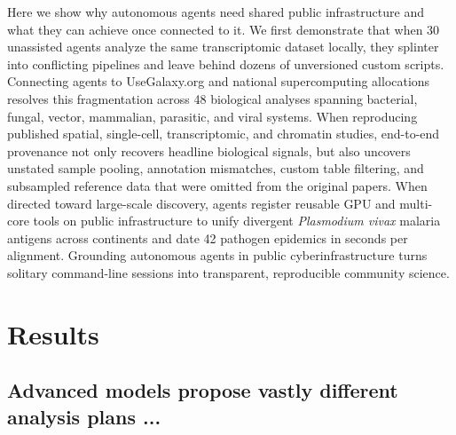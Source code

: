 \documentclass[11pt,letterpaper]{article}
\begin{document}
Here we show why autonomous agents need shared public infrastructure and what they can achieve once connected to it. We first demonstrate that when 30 unassisted agents analyze the same transcriptomic dataset locally, they splinter into conflicting pipelines and leave behind dozens of unversioned custom scripts. Connecting agents to UseGalaxy.org and national supercomputing allocations resolves this fragmentation across 48 biological analyses spanning bacterial, fungal, vector, mammalian, parasitic, and viral systems. When reproducing published spatial, single-cell, transcriptomic, and chromatin studies, end-to-end provenance not only recovers headline biological signals, but also uncovers unstated sample pooling, annotation mismatches, custom table filtering, and subsampled reference data that were omitted from the original papers. When directed toward large-scale discovery, agents register reusable GPU and multi-core tools on public infrastructure to unify divergent \textit{Plasmodium vivax} malaria antigens across continents and date 42 pathogen epidemics in seconds per alignment. Grounding autonomous agents in public cyberinfrastructure turns solitary command-line sessions into transparent, reproducible community science.

\section{Results}

\subsection{Advanced models propose vastly different analysis plans ...}
\end{document}
